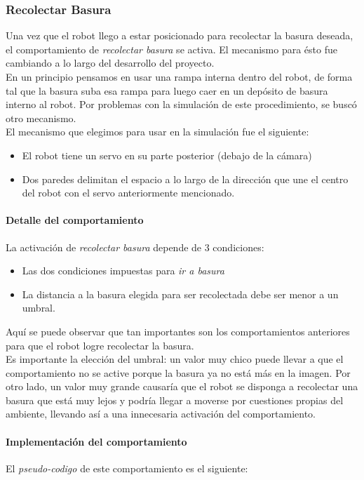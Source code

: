 \subsubsection{Recolectar Basura}
\label{collect_garbage}
Una vez que el robot llego a estar posicionado para recolectar la basura deseada,
el comportamiento de \emph{recolectar basura} se activa. El mecanismo para \'esto
fue cambiando a lo largo del desarrollo del proyecto.
\\
En un principio pensamos en usar una rampa interna dentro del robot, de forma
tal que la basura suba esa rampa para luego caer en un dep\'osito de basura
interno al robot. Por problemas con la simulaci\'on de este procedimiento, se
busc\'o otro mecanismo.
\\
El mecanismo que elegimos para usar en la simulaci\'on fue el siguiente:
\begin{itemize}
	\item El robot tiene un servo en su parte posterior (debajo de la c\'amara)
	\item Dos paredes delimitan el espacio a lo largo de la direcci\'on que une
			el centro del robot con el servo anteriormente mencionado.
\end{itemize}

\paragraph{Detalle del comportamiento}
La activaci\'on de \emph{recolectar basura} depende de 3 condiciones:
\begin{itemize}
	\item Las dos condiciones impuestas para \emph{ir a basura}
	\item La distancia a la basura elegida para ser recolectada debe ser menor a
			un umbral.
\end{itemize}

Aqu\'i se puede observar que tan importantes son los comportamientos anteriores
para que el robot logre recolectar la basura.
\\
Es importante la elecci\'on del umbral: un valor muy chico puede llevar a que el
comportamiento no se active porque la basura ya no est\'a m\'as en la imagen. Por
otro lado, un valor muy grande causar\'ia que el robot se disponga a recolectar 
una basura que est\'a muy lejos y podr\'ia llegar a moverse por cuestiones propias
del ambiente, llevando as\'i a una innecesaria activaci\'on del comportamiento.

\paragraph{Implementaci\'on del comportamiento}
El \emph{pseudo-codigo} de este comportamiento es el siguiente:

